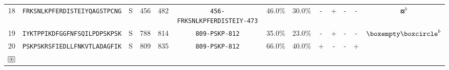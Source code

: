 \begin{tabular}{rcccccccccccc}
18 &  \texttt{FRKSNLKPFERDISTEIYQAGSTPCNG} &       S &    456 &   482 &  \texttt{{\scriptsize 456-}FRKSNLKPFERDISTEIY{\scriptsize -473}} &                          46.0\% &                           30.0\% &          - &           + &          - &           - &                                                                                                                               $ \boxcircle^b $ \\
19 &  \texttt{IYKTPPIKDFGGFNFSQILPDPSKPSK} &       S &    788 &   814 &                \texttt{{\scriptsize 809-}PSKP{\scriptsize -812}} &                          35.0\% &                           23.0\% &          - &           + &          - &           - &                                                                                                                     $ \boxempty \boxcircle^b $ \\
20 &  \texttt{PSKPSKRSFIEDLLFNKVTLADAGFIK} &       S &    809 &   835 &                \texttt{{\scriptsize 809-}PSKP{\scriptsize -812}} &                          66.0\% &                           40.0\% &          + &           - &          - &           + &                             \Centerstack{  $\boxast \boxast^b \boxcircle \boxcircle^d$ \\  $\setlength{\fboxsep}{0.5pt} \boxed{\circledast}$ } \\
\bottomrule
\end{tabular}
